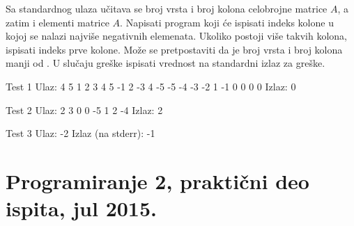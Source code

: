\begin{Exercise}[label=903]
Sa standardnog ulaza učitava se broj vrsta i broj kolona celobrojne matrice $A$, 
a zatim i elementi matrice $A$. Napisati program koji će ispisati indeks kolone u kojoj se nalazi najviše negativnih elemenata. 
Ukoliko postoji više takvih kolona, ispisati indeks prve kolone. 
Može se pretpostaviti da je broj vrsta i broj kolona manji od . 
U slučaju greške ispisati vrednost  na standardni izlaz za greške. 

\begin{minitest}
\begin{test}{Test 1}
Ulaz:                         
  4 5                                                           
  1  2  3  4  5               
 -1  2 -3  4 -5                
 -5 -4 -3 -2  1               
 -1  0  0  0  0 
 Izlaz:                         
  0                                                    
\end{test}
\end{minitest}
\begin{minitest}
\begin{test}{Test 2}
Ulaz:                         
 2 3
 0 0 -5
 1 2 -4
 Izlaz:  
 2 
\end{test}
\end{minitest}
\begin{minitest}
\begin{test}{Test 3}
Ulaz:                         
 -2
Izlaz (na stderr):
 -1
\end{test}
\end{minitest}

\end{Exercise}
\begin{Answer}[ref=903]
\end{Answer}

\section{Programiranje 2, praktični deo ispita, jul 2015.}


